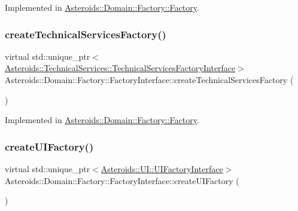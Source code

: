 Implemented in \hyperlink{classAsteroids_1_1Domain_1_1Factory_1_1Factory_abc6cc7d441ceeca66671c79cff1e0c99}{Asteroids\+::\+Domain\+::\+Factory\+::\+Factory}.

\mbox{\label{classAsteroids_1_1Domain_1_1Factory_1_1FactoryInterface_a9b67997dd9975091acd7f407e2aa71b1}} 
\subsubsection{\texorpdfstring{create\+Technical\+Services\+Factory()}{createTechnicalServicesFactory()}}
{\footnotesize\ttfamily virtual std\+::unique\+\_\+ptr$<$\hyperlink{classAsteroids_1_1TechnicalServices_1_1TechnicalServicesFactoryInterface}{Asteroids\+::\+Technical\+Services\+::\+Technical\+Services\+Factory\+Interface}$>$ Asteroids\+::\+Domain\+::\+Factory\+::\+Factory\+Interface\+::create\+Technical\+Services\+Factory (\begin{DoxyParamCaption}{ }\end{DoxyParamCaption})\hspace{0.3cm}{\ttfamily [pure virtual]}}



Implemented in \hyperlink{classAsteroids_1_1Domain_1_1Factory_1_1Factory_a8ea28b3c5b9c351eb49ac2f97786b7b1}{Asteroids\+::\+Domain\+::\+Factory\+::\+Factory}.

\mbox{\label{classAsteroids_1_1Domain_1_1Factory_1_1FactoryInterface_a2576e64553a529bd6161acb3aea9d773}} 
\subsubsection{\texorpdfstring{create\+U\+I\+Factory()}{createUIFactory()}}
{\footnotesize\ttfamily virtual std\+::unique\+\_\+ptr$<$\hyperlink{classAsteroids_1_1UI_1_1UIFactoryInterface}{Asteroids\+::\+U\+I\+::\+U\+I\+Factory\+Interface}$>$ Asteroids\+::\+Domain\+::\+Factory\+::\+Factory\+Interface\+::create\+U\+I\+Factory (\begin{DoxyParamCaption}{ }\end{DoxyParamCaption})\hspace{0.3cm}{\ttfamily [pure virtual]}}



